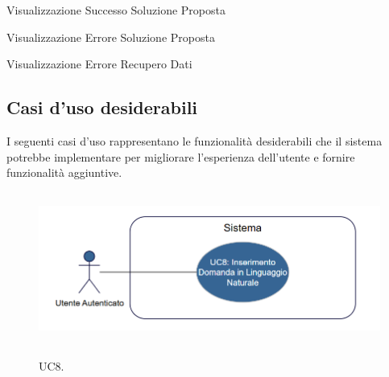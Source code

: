 \begin{usecase}{6.1}{Visualizzazione Successo Soluzione Proposta}
\label{uc:uc6.1_soluzione_ok}
\end{usecase}

\begin{usecase}{6.2}{Visualizzazione Errore Soluzione Proposta}
\label{uc:uc6.2_soluzione_err}
\end{usecase}

\begin{usecase}{7}{Visualizzazione Errore Recupero Dati}
\label{uc:uc7_errore_dati}
\end{usecase}

\subsection{Casi d'uso desiderabili}
I seguenti casi d'uso rappresentano le funzionalità desiderabili che il sistema potrebbe implementare per migliorare l'esperienza dell'utente e fornire funzionalità aggiuntive.

\begin{figure}[htbp]
    \centering
    \includegraphics[alt={Diagramma UML Inserimento Domanda in Linguaggio Naturale}, height=5cm]{img/usecase/UC8.png}
    \caption{UC8.}
    \label{fig:uc8_domanda_nl}
\end{figure}

